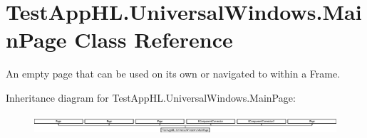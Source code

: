 \hypertarget{class_test_app_h_l_1_1_universal_windows_1_1_main_page}{}\section{Test\+App\+H\+L.\+Universal\+Windows.\+Main\+Page Class Reference}
\label{class_test_app_h_l_1_1_universal_windows_1_1_main_page}


An empty page that can be used on its own or navigated to within a Frame.  


Inheritance diagram for Test\+App\+H\+L.\+Universal\+Windows.\+Main\+Page\+:\begin{figure}[H]
\begin{center}
\leavevmode
\includegraphics[height=0.746667cm]{class_test_app_h_l_1_1_universal_windows_1_1_main_page}
\end{center}
\end{figure}
